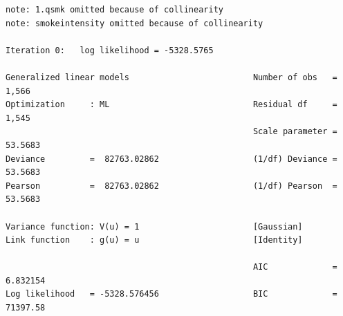 \documentclass[
  10pt,
]{book}
\begin{document}
\begin{verbatim}
note: 1.qsmk omitted because of collinearity
note: smokeintensity omitted because of collinearity

Iteration 0:   log likelihood = -5328.5765  

Generalized linear models                         Number of obs   =      1,566
Optimization     : ML                             Residual df     =      1,545
                                                  Scale parameter =    53.5683
Deviance         =  82763.02862                   (1/df) Deviance =    53.5683
Pearson          =  82763.02862                   (1/df) Pearson  =    53.5683

Variance function: V(u) = 1                       [Gaussian]
Link function    : g(u) = u                       [Identity]

                                                  AIC             =   6.832154
Log likelihood   = -5328.576456                   BIC             =   71397.58


\end{verbatim}
\end{document}
